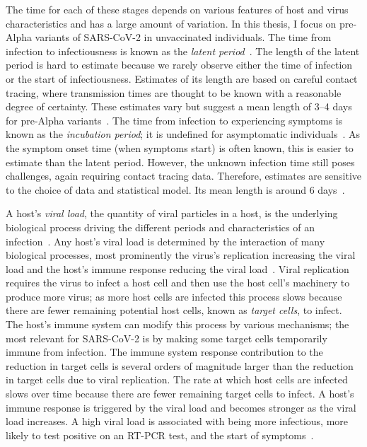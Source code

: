\documentclass[thesis.tex]{subfiles}
\begin{document}
The time for each of these stages depends on various features of host and virus characteristics and has a large amount of variation.
In this thesis, I focus on pre-Alpha variants of SARS-CoV-2 in unvaccinated individuals.
The time from infection to infectiousness is known as the \emph{latent period}~\autocite{goughEstimation}.
The length of the latent period is hard to estimate because we rarely observe either the time of infection or the start of infectiousness.
Estimates of its length are based on careful contact tracing, where transmission times are thought to be known with a reasonable degree of certainty.
These estimates vary but suggest a mean length of 3--4 days for pre-Alpha variants~\autocite[and references therein]{zhaoEstimating}.
The time from infection to experiencing symptoms is known as the \emph{incubation period}; it is undefined for asymptomatic individuals~\autocite{portaEpiDictionary}.
As the symptom onset time (when symptoms start) is often known, this is easier to estimate than the latent period.
However, the unknown infection time still poses challenges, again requiring contact tracing data.
Therefore, estimates are sensitive to the choice of data and statistical model.
Its mean length is around 6 days~\autocite{wuIncubation,raiIncubation,aleneSerial}.

A host's \emph{viral load}, the quantity of viral particles in a host, is the underlying biological process driving the different periods and characteristics of an infection~\autocite{puhachSARSCoV2}.
Any host's viral load is determined by the interaction of many biological processes, most prominently the virus's replication increasing the viral load and the host's immune response reducing the viral load~\autocite{keVivo}.
Viral replication requires the virus to infect a host cell and then use the host cell's machinery to produce more virus; as more host cells are infected this process slows because there are fewer remaining potential host cells, known as \emph{target cells}, to infect.
The host's immune system can modify this process by various mechanisms; the most relevant for SARS-CoV-2 is by making some target cells temporarily immune from infection.
The immune system response contribution to the reduction in target cells is several orders of magnitude larger than the reduction in target cells due to viral replication.
The rate at which host cells are infected slows over time because there are fewer remaining target cells to infect.
A host's immune response is triggered by the viral load and becomes stronger as the viral load increases.
A high viral load is associated with being more infectious, more likely to test positive on an RT-PCR test, and the start of symptoms~\autocite{puhachSARSCoV2,keVivo}.
\end{document}

